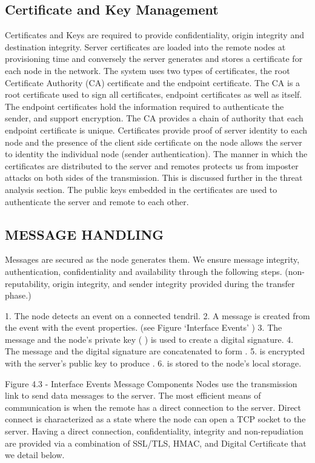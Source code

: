 \subsection{Certificate and Key Management}
Certificates and Keys are required to provide confidentiality, origin integrity and destination integrity. Server certificates are loaded into the remote nodes at provisioning time and conversely the server generates and stores a certificate for each node in the network. The system uses two types of certificates, the root Certificate Authority (CA) certificate and the endpoint certificate. 
The CA is a root certificate used to sign all certificates, endpoint certificates as well as itself. The endpoint certificates hold the information required to authenticate the sender, and support encryption. The CA provides a chain of authority that each endpoint certificate is unique. 
Certificates provide proof of server identity to each node and the presence of the client side certificate on the node allows the server to identity the individual node (sender authentication). 
The manner in which the certificates are distributed to the server and remotes protects us from imposter attacks on both sides of the transmission. This is discussed further in the threat analysis section. 
  The public keys embedded in the certificates are used to authenticate the server and remote to each other. 

\subsection{MESSAGE HANDLING}
  Messages are secured as the node generates them. We ensure message integrity, authentication, confidentiality and availability through the following steps. (non-reputability, origin integrity, and sender integrity provided during the transfer phase.) 

  1.  The node detects an event on a connected tendril.
  2.  A message is created from the event with the event properties. (see Figure ‘Interface Events’ )
  3.  The message and the node’s private key ( ) is used to create a digital signature.
  4.  The message and the digital signature are concatenated to form  .
  5.    is encrypted with the server’s public key to produce  .
  6.    is stored to the node’s local storage.
   
   Figure 4.3 - Interface Events
   Message Components
   Nodes use the transmission link to send data messages to the server. The most efficient means of communication is when the remote has a direct connection to the server. Direct connect is characterized as a state where the node can open a TCP socket to the server. Having a direct connection, confidentiality, integrity and non-repudiation are provided via a combination of SSL/TLS, HMAC, and Digital Certificate that we detail below.
    
